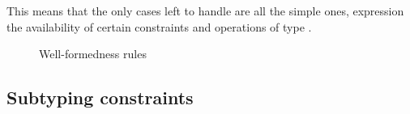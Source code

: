 \documentclass[preprint,nocopyrightspace,9pt]{sigplanconf}
\begin{document}
This means that the only cases left to handle are all the simple
ones, expression the availability of certain constraints and
operations of type .


\begin{figure}





\caption{Well-formedness rules}
\label{fig:wf}
\end{figure}


\subsection{Subtyping constraints}
\end{document}
